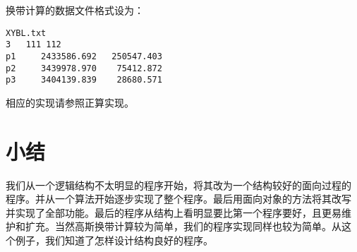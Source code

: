 换带计算的数据文件格式设为：
\begin{verbatim}
XYBL.txt
3   111 112
p1     2433586.692   250547.403
p2     3439978.970    75412.872
p3     3404139.839    28680.571
\end{verbatim}
相应的实现请参照正算实现。

\section{小结}
我们从一个逻辑结构不太明显的程序开始，将其改为一个结构较好的面向过程的
程序。并从一个算法开始逐步实现了整个程序。最后用面向对象的方法将其改写
并实现了全部功能。最后的程序从结构上看明显要比第一个程序要好，且更易维
护和扩充。当然高斯换带计算较为简单，我们的程序实现同样也较为简单。从这
个例子，我们知道了怎样设计结构良好的程序。
